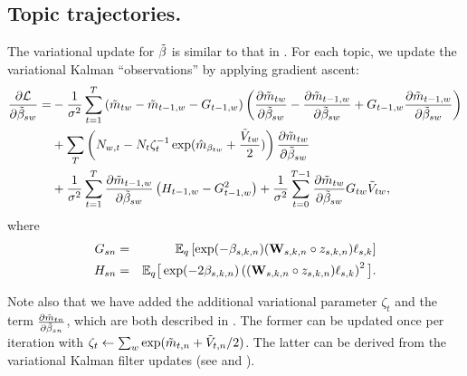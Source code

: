 % 
\subsection{Topic trajectories.}
The variational update for $\tilde{\beta}$ is similar to that in
\cite{blei:2006}. For each topic, we update the variational Kalman   %
``observations'' by applying gradient ascent:
\begin{align*}
\frac{\partial \mathcal{L}}{\partial \tilde{\beta}_{sw}} =
   & -  \frac{1}{\sigma^2} \sum_{t=1}^T
     \left( \tilde{m}_{tw} - \tilde{m}_{t-1,w} - G_{t-1,w} \right) 
      \left( \frac{\partial \tilde{m}_{tw}}{\partial \tilde{\beta}_{sw}}
     - \frac{\partial \tilde{m}_{t-1,w}}{\partial \tilde{\beta}_{sw}}
     + G_{t-1,w} \frac{\partial \tilde{m}_{t-1,w}}{\partial \tilde{\beta}_{sw}} \right) \\
   & +  \sum_T \left(
       N_{w,t} - N_{t} \zeta_t^{-1}
       \exp( \hat{m}_{\beta_{tw}} + \frac{\tilde{V}_{tw}}{2} ) \right)
       \frac{\partial \tilde{m}_{tw}}{\partial \tilde{\beta}_{sw}}  \\
    & +  \frac{1}{\sigma^2} \sum_{t=1}^T
         \frac{\partial \tilde{m}_{t-1,w}}{\partial \tilde{\beta}_{sw}}
         \left( H_{t-1,w} - G_{t-1,w}^2 \right) 
    +  \frac{1}{\sigma^2} \sum_{t=0}^{T-1}
         \frac{\partial \tilde{m}_{tw}}{\partial \tilde{\beta}_{sw}}
         G_{tw} \tilde{V}_{tw},
\end{align*}
where
\begin{eqnarray*}
 G_{sn} &=& \mathbb{E}_q\left[\exp(-\beta_{s,k,n} ) ( \textbf{W}_{s,k,n} \circ
  z_{s,k,n} ) \ell_{s,k}\right] \\
 H_{sn} &=& \mathbb{E}_q \big[ \exp(-2 \beta_{s,k,n}) \left( (\textbf{W}_{s,k,n} \circ z_{s,k,n} ) \ell_{s,k} \right)^2 \big].
\end{eqnarray*}

Note also that we have added the additional variational parameter
$\zeta_t$ and the term $\frac{\partial \tilde{m}_{tn}}{\partial \tilde{\beta}_{sn}}$, which are both
described in \cite{blei:2006}. The %
former can be updated once per iteration with $\zeta_t \gets \sum_w
\exp(\tilde{m}_{t,n} + \tilde{V}_{t,n}/2)$. The latter can be derived from the
variational Kalman filter updates (see  and
\cite{blei:2006}).
